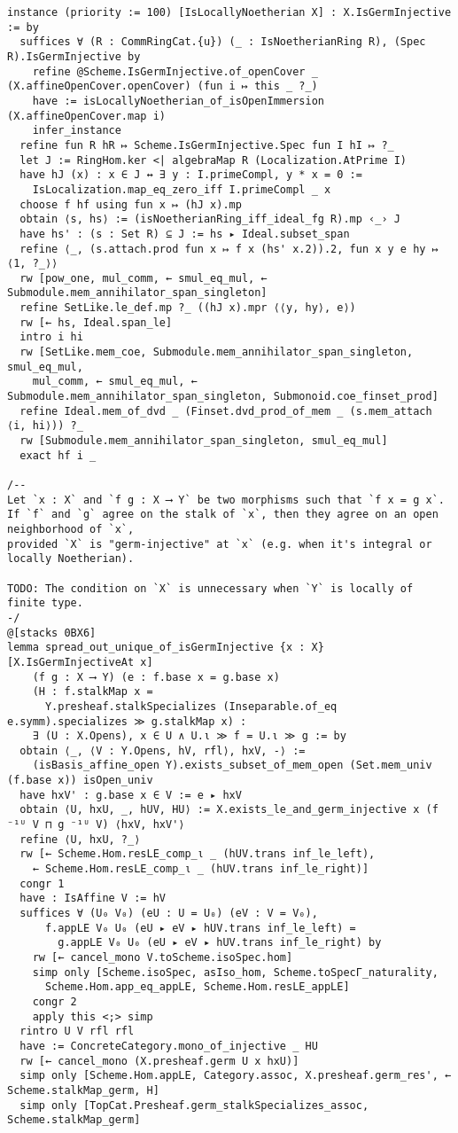 \documentclass{article}
\begin{document}
\begin{lstlisting}[language=Lean, caption={SpreadingOut.lean}]
instance (priority := 100) [IsLocallyNoetherian X] : X.IsGermInjective := by
  suffices ∀ (R : CommRingCat.{u}) (_ : IsNoetherianRing R), (Spec R).IsGermInjective by
    refine @Scheme.IsGermInjective.of_openCover _ (X.affineOpenCover.openCover) (fun i ↦ this _ ?_)
    have := isLocallyNoetherian_of_isOpenImmersion (X.affineOpenCover.map i)
    infer_instance
  refine fun R hR ↦ Scheme.IsGermInjective.Spec fun I hI ↦ ?_
  let J := RingHom.ker <| algebraMap R (Localization.AtPrime I)
  have hJ (x) : x ∈ J ↔ ∃ y : I.primeCompl, y * x = 0 :=
    IsLocalization.map_eq_zero_iff I.primeCompl _ x
  choose f hf using fun x ↦ (hJ x).mp
  obtain ⟨s, hs⟩ := (isNoetherianRing_iff_ideal_fg R).mp ‹_› J
  have hs' : (s : Set R) ⊆ J := hs ▸ Ideal.subset_span
  refine ⟨_, (s.attach.prod fun x ↦ f x (hs' x.2)).2, fun x y e hy ↦ ⟨1, ?_⟩⟩
  rw [pow_one, mul_comm, ← smul_eq_mul, ← Submodule.mem_annihilator_span_singleton]
  refine SetLike.le_def.mp ?_ ((hJ x).mpr ⟨⟨y, hy⟩, e⟩)
  rw [← hs, Ideal.span_le]
  intro i hi
  rw [SetLike.mem_coe, Submodule.mem_annihilator_span_singleton, smul_eq_mul,
    mul_comm, ← smul_eq_mul, ← Submodule.mem_annihilator_span_singleton, Submonoid.coe_finset_prod]
  refine Ideal.mem_of_dvd _ (Finset.dvd_prod_of_mem _ (s.mem_attach ⟨i, hi⟩)) ?_
  rw [Submodule.mem_annihilator_span_singleton, smul_eq_mul]
  exact hf i _

/--
Let `x : X` and `f g : X ⟶ Y` be two morphisms such that `f x = g x`.
If `f` and `g` agree on the stalk of `x`, then they agree on an open neighborhood of `x`,
provided `X` is "germ-injective" at `x` (e.g. when it's integral or locally Noetherian).

TODO: The condition on `X` is unnecessary when `Y` is locally of finite type.
-/
@[stacks 0BX6]
lemma spread_out_unique_of_isGermInjective {x : X} [X.IsGermInjectiveAt x]
    (f g : X ⟶ Y) (e : f.base x = g.base x)
    (H : f.stalkMap x =
      Y.presheaf.stalkSpecializes (Inseparable.of_eq e.symm).specializes ≫ g.stalkMap x) :
    ∃ (U : X.Opens), x ∈ U ∧ U.ι ≫ f = U.ι ≫ g := by
  obtain ⟨_, ⟨V : Y.Opens, hV, rfl⟩, hxV, -⟩ :=
    (isBasis_affine_open Y).exists_subset_of_mem_open (Set.mem_univ (f.base x)) isOpen_univ
  have hxV' : g.base x ∈ V := e ▸ hxV
  obtain ⟨U, hxU, _, hUV, HU⟩ := X.exists_le_and_germ_injective x (f ⁻¹ᵁ V ⊓ g ⁻¹ᵁ V) ⟨hxV, hxV'⟩
  refine ⟨U, hxU, ?_⟩
  rw [← Scheme.Hom.resLE_comp_ι _ (hUV.trans inf_le_left),
    ← Scheme.Hom.resLE_comp_ι _ (hUV.trans inf_le_right)]
  congr 1
  have : IsAffine V := hV
  suffices ∀ (U₀ V₀) (eU : U = U₀) (eV : V = V₀),
      f.appLE V₀ U₀ (eU ▸ eV ▸ hUV.trans inf_le_left) =
        g.appLE V₀ U₀ (eU ▸ eV ▸ hUV.trans inf_le_right) by
    rw [← cancel_mono V.toScheme.isoSpec.hom]
    simp only [Scheme.isoSpec, asIso_hom, Scheme.toSpecΓ_naturality,
      Scheme.Hom.app_eq_appLE, Scheme.Hom.resLE_appLE]
    congr 2
    apply this <;> simp
  rintro U V rfl rfl
  have := ConcreteCategory.mono_of_injective _ HU
  rw [← cancel_mono (X.presheaf.germ U x hxU)]
  simp only [Scheme.Hom.appLE, Category.assoc, X.presheaf.germ_res', ← Scheme.stalkMap_germ, H]
  simp only [TopCat.Presheaf.germ_stalkSpecializes_assoc, Scheme.stalkMap_germ]


\end{lstlisting}
\end{document}
